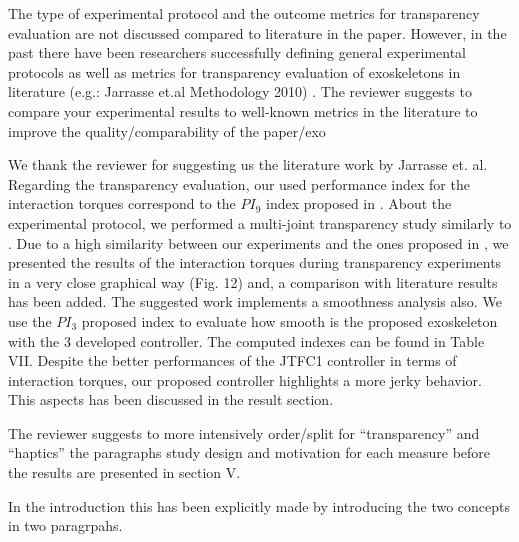 \begin{point}
The type of experimental protocol and the outcome metrics for
transparency evaluation are not discussed compared to literature in the
paper. However, in the past there have been researchers successfully
defining general experimental protocols as well as metrics for
transparency evaluation of exoskeletons in literature (e.g.: Jarrasse
et.al Methodology 2010) \cite{jarrasse2010methodology}. The reviewer suggests to compare your
experimental results to well-known metrics in the literature to improve
the quality/comparability of the paper/exo
	\label{pt:transparency}
\end{point}

\begin{reply}
We thank the reviewer for suggesting us the literature work \cite{jarrasse2010methodology} by Jarrasse et. al. 
Regarding the transparency evaluation, our used performance index for the interaction torques correspond to the $PI_9$ index proposed in \cite{jarrasse2010methodology}. 
About the experimental protocol, we performed a multi-joint transparency study similarly to \cite{just2018exoskeleton}. Due to a high similarity between our experiments and the ones proposed in \cite{just2018exoskeleton}, we presented the results of the interaction torques during transparency experiments in a very close graphical way (Fig. 12) and, a comparison with literature results has been added.
The suggested work \cite{jarrasse2010methodology} implements a smoothness analysis also. We use the $PI_3$ proposed index to evaluate how smooth is the proposed exoskeleton with the 3 developed controller. The computed indexes can be found in Table VII. Despite the better performances of the JTFC1 controller in terms of interaction torques, our proposed controller highlights a more jerky behavior. This aspects has been discussed in the result section.
\end{reply}



\begin{point}
The reviewer suggests to more intensively order/split for
“transparency” and “haptics” the paragraphs study design and motivation
for each measure before the results are presented in section V.

\end{point}

\begin{reply}
In the introduction this has been explicitly made by introducing the two concepts in two paragrpahs.
\end{reply}



